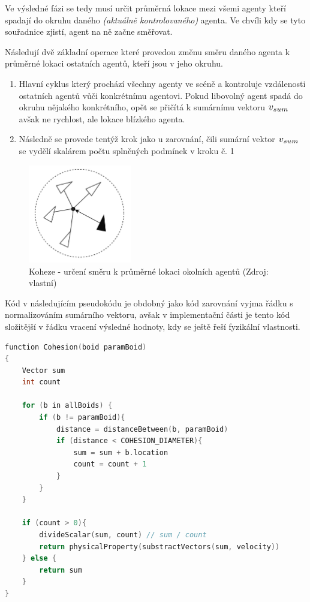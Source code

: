 \documentclass[czech,public,dept460,male,cpdeclaration]{diploma}
\begin{document}
Ve výsledné fázi se tedy musí určit průměrná lokace mezi všemi agenty kteří spadají do okruhu daného \textit{(aktuálně kontrolovaného)} agenta. Ve chvíli kdy se tyto souřadnice zjistí, agent na ně začne směřovat.

Následují dvě základní operace které provedou změnu směru daného agenta k průměrné lokaci ostatních agentů, kteří jsou v jeho okruhu.

\begin{enumerate}
	\item Hlavní cyklus který prochází všechny agenty ve scéně a kontroluje vzdálenosti ostatních agentů vůči konkrétnímu agentovi. Pokud libovolný agent spadá do okruhu nějakého konkrétního, opět se přičítá k sumárnímu vektoru \( \scalebox{1.2}{$v_{sum}$} \) avšak ne rychlost, ale lokace blízkého agenta.
	\item Následně se provede tentýž krok jako u zarovnání, čili sumární vektor \( \scalebox{1.2}{$v_{sum}$} \) se vydělí skalárem počtu splněných podmínek v kroku č. 1
	
\end{enumerate}

\begin{figure}[H]\centering\includegraphics[width=0.4\textwidth]{Figures/cohesion2.jpg}
	\caption{Koheze - určení směru k průměrné lokaci okolních agentů (Zdroj: vlastní)}
\end{figure}

Kód v následujícím pseudokódu je obdobný jako kód zarovnání vyjma řádku s normalizováním sumárního vektoru, avšak v implementační části je tento kód složitější v řádku vracení výsledné hodnoty, kdy se ještě řeší fyzikální vlastnosti.

\begin{lstlisting}[language=c++,label=src:Cohesion pseudocode,caption=Pseudokód pro kohezi (Zdroj: vlastní)]
function Cohesion(boid paramBoid)
{	
	Vector sum
	int count
	
	for (b in allBoids) {
		if (b != paramBoid){
			distance = distanceBetween(b, paramBoid)
			if (distance < COHESION_DIAMETER){
				sum = sum + b.location
				count = count + 1
			}
		}
	}
	
	if (count > 0){
		divideScalar(sum, count) // sum / count
		return physicalProperty(substractVectors(sum, velocity))
	} else {
		return sum
	}
}
\end{lstlisting}
\end{document}
